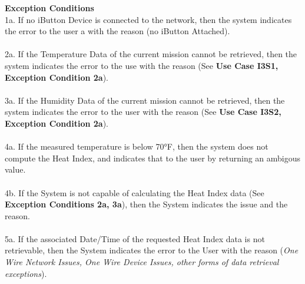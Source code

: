 \documentclass[letterpaper]{article}
\begin{document}
\textbf{Exception Conditions}\\
1a.  If no iButton Device is connected to the network, then the
system indicates the error to the user a with the reason (no iButton
Attached).\\\\
2a.  If the Temperature Data of the current mission cannot be
retrieved, then the system indicates the error to the use with the
reason (See \textbf{Use Case I3S1, Exception Condition 2a}).\\\\
3a.  If the Humidity Data of the current mission cannot be retrieved,
then the system indicates the error to the user with the reason (See
\textbf{Use Case I3S2, Exception Condition 2a}).\\\\
4a.  If the measured temperature is below \ang{70}F, then the system
does not compute the Heat Index, and indicates that to the user by
returning an ambigous value.\\\\
4b.  If the System is not capable of calculating the Heat Index data
(See \textbf{Exception Conditions 2a, 3a}), then the System indicates
the issue and the reason.\\\\
5a.  If the associated Date/Time of the requested Heat Index data is
not retrievable, then the System indicates the error to the User with
the reason (\textit{One Wire Network Issues, One Wire Device Issues,
other forms of data retrieval exceptions}).
\end{document}
